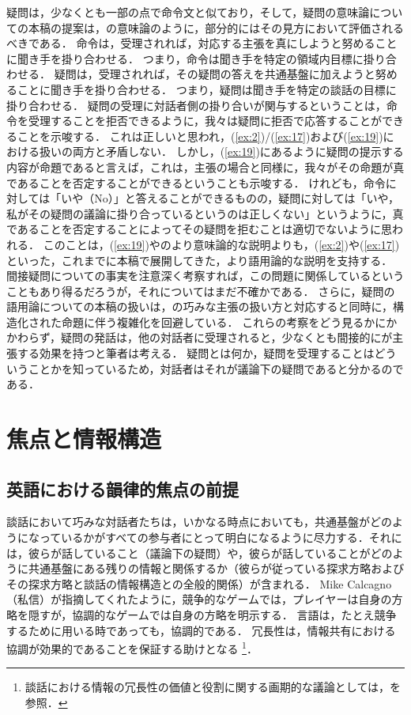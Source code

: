 \documentclass{goken}
\newcommand{\ori}[1]{\noindent\textcolor[gray]{0.7}{\fontsize{8pt}{8pt}\selectfont{\textsf{(p.~#1)}}} }
\begin{document}
疑問は，少なくとも一部の点で命令文と似ており，そして，疑問の意味論についての本稿の提案は，\citeauthor{vonStechow1991}の意味論のように，部分的にはその見方において評価されるべきである．
\ori{26}
命令は，受理されれば，対応する主張を真にしようと努めることに聞き手を掛り合わせる．
つまり，命令は聞き手を特定の領域内目標に掛り合わせる．
疑問は，受理されれば，その疑問の答えを共通基盤に加えようと努めることに聞き手を掛り合わせる．
つまり，疑問は聞き手を特定の談話の目標に掛り合わせる．
疑問の受理に対話者側の掛り合いが関与するということは，命令を受理することを拒否できるように，我々は疑問に拒否で応答することができることを示唆する．
これは正しいと思われ，(\ref{ex:2})/(\ref{ex:17})および(\ref{ex:19})における扱いの両方と矛盾しない．
しかし，(\ref{ex:19})にあるように疑問の提示する内容が命題であると言えば，これは，主張の場合と同様に，我々がその命題が真であることを否定することができるということも示唆する．
けれども，命令に対しては「いや（No）」と答えることができるものの，疑問に対しては「いや，私がその疑問の議論に掛り合っているというのは正しくない」というように，真であることを否定することによってその疑問を拒むことは適切でないように思われる．
このことは，(\ref{ex:19})や\citealt{vonStechow1991}のより意味論的な説明よりも，(\ref{ex:2})や(\ref{ex:17})といった，これまでに本稿で展開してきた，より語用論的な説明を支持する．
間接疑問についての事実を注意深く考察すれば，この問題に関係しているということもあり得るだろうが，それについてはまだ不確かである．
さらに，疑問の語用論についての本稿の扱いは，\citealt{Stalnaker1978}の巧みな主張の扱い方と対応すると同時に，構造化された命題に伴う複雑化を回避している．
これらの考察をどう見るかにかかわらず，疑問の発話は，他の対話者に受理されると，少なくとも間接的に\citeauthor{vonStechow1991}が主張する効果を持つと筆者は考える．
疑問とは何か，疑問を受理することはどういうことかを知っているため，対話者はそれが議論下の疑問であると分かるのである．

\section{焦点と情報構造}\label{sec:2}

\subsection{英語における韻律的焦点の前提}\label{sec:2.1}

談話において巧みな対話者たちは，いかなる時点においても，共通基盤がどのようになっているかがすべての参与者にとって明白になるように尽力する．それには，彼らが話していること（議論下の疑問）や，彼らが話していることがどのように共通基盤にある残りの情報と関係するか（彼らが従っている探求方略およびその探求方略と談話の情報構造との全般的関係）が含まれる．
Mike Calcagno（私信）が指摘してくれたように，競争的なゲームでは，プレイヤーは自身の方略を隠すが，協調的なゲームでは自身の方略を明示する．
言語は，たとえ競争するために用いる時であっても，協調的である．
\ori{27}
冗長性は，情報共有における協調が効果的であることを保証する助けとなる
\footnote{%
  談話における情報の冗長性の価値と役割に関する画期的な議論としては，\citealt{Walker1993}を参照．
}．
\end{document}
